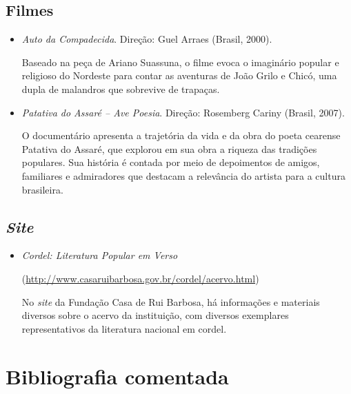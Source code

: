 \documentclass{article}
\begin{document}
\subsection{Filmes}
\begin{itemize}
\item\textit{Auto da Compadecida}. Direção: Guel Arraes (Brasil, 2000).

Baseado na peça de Ariano Suassuna, o filme evoca o imaginário popular e
religioso do Nordeste para contar as aventuras de João Grilo e Chicó,
uma dupla de malandros que sobrevive de trapaças.

\item\textit{Patativa do Assaré -- Ave Poesia}. Direção: Rosemberg Cariny (Brasil, 2007).

O documentário apresenta a trajetória da vida e da obra do poeta
cearense Patativa do Assaré, que explorou em sua obra a riqueza das
tradições populares. Sua história é contada por meio de depoimentos de
amigos, familiares e admiradores que destacam a relevância do artista
para a cultura brasileira.
\end{itemize}

\subsection{\emph{Site}}

\begin{itemize}
\item\textit{Cordel: Literatura Popular em Verso}

(\url{http://www.casaruibarbosa.gov.br/cordel/acervo.html})

No \emph{site} da Fundação Casa de Rui Barbosa, há informações e
materiais diversos sobre o acervo da instituição, com diversos
exemplares representativos da literatura nacional em cordel.
\end{itemize}

\section{Bibliografia comentada}
\end{document}
